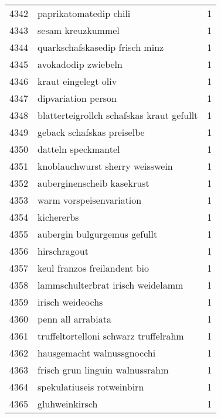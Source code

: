 \begin{tabular}{llr}
4342 &                             paprikatomatedip chili &      1 \\
4343 &                                  sesam kreuzkummel &      1 \\
4344 &                     quarkschafskasedip frisch minz &      1 \\
4345 &                                avokadodip zwiebeln &      1 \\
4346 &                               kraut eingelegt oliv &      1 \\
4347 &                                dipvariation person &      1 \\
4348 &          blatterteigrollch schafskas kraut gefullt &      1 \\
4349 &                         geback schafskas preiselbe &      1 \\
4350 &                                datteln speckmantel &      1 \\
4351 &                    knoblauchwurst sherry weisswein &      1 \\
4352 &                         auberginenscheib kasekrust &      1 \\
4353 &                           warm vorspeisenvariation &      1 \\
4354 &                                         kichererbs &      1 \\
4355 &                       aubergin bulgurgemus gefullt &      1 \\
4356 &                                       hirschragout &      1 \\
4357 &                       keul franzos freilandent bio &      1 \\
4358 &                  lammschulterbrat irisch weidelamm &      1 \\
4359 &                                   irisch weideochs &      1 \\
4360 &                                 penn all arrabiata &      1 \\
4361 &              truffeltortelloni schwarz truffelrahm &      1 \\
4362 &                         hausgemacht walnussgnocchi &      1 \\
4363 &                    frisch grun linguin walnussrahm &      1 \\
4364 &                         spekulatiuseis rotweinbirn &      1 \\
4365 &                                     gluhweinkirsch &      1 \\

\end{tabular}
